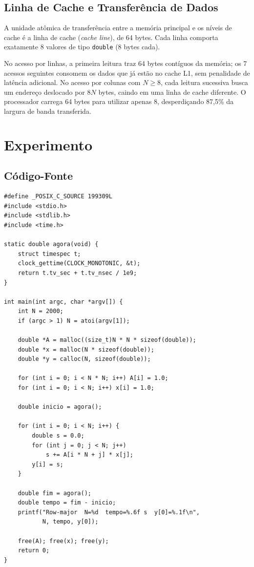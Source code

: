 \documentclass[11pt,letterpaper]{article}
\begin{document}
\subsection{Linha de Cache e Transferência de Dados}

A unidade atômica de transferência entre a memória principal e os níveis de cache é a linha de cache (\textit{cache line}), de 64 bytes. Cada linha comporta exatamente 8 valores de tipo \texttt{double} (8 bytes cada). 

No acesso por linhas, a primeira leitura traz 64 bytes contíguos da memória; os 7 acessos seguintes consomem os dados que já estão no cache L1, sem penalidade de latência adicional. No acesso por colunas com $N \ge 8$, cada leitura sucessiva busca um endereço deslocado por $8N$ bytes, caindo em uma linha de cache diferente. O processador carrega 64 bytes para utilizar apenas 8, desperdiçando 87,5\% da largura de banda transferida.

\newpage
\section{Experimento}

\subsection{Código-Fonte}

\begin{lstlisting}[caption={Acesso por linhas (row-major)}, label={lst:row}]
#define _POSIX_C_SOURCE 199309L
#include <stdio.h>
#include <stdlib.h>
#include <time.h>

static double agora(void) {
    struct timespec t;
    clock_gettime(CLOCK_MONOTONIC, &t);
    return t.tv_sec + t.tv_nsec / 1e9;
}

int main(int argc, char *argv[]) {
    int N = 2000;
    if (argc > 1) N = atoi(argv[1]);

    double *A = malloc((size_t)N * N * sizeof(double));
    double *x = malloc(N * sizeof(double));
    double *y = calloc(N, sizeof(double));

    for (int i = 0; i < N * N; i++) A[i] = 1.0;
    for (int i = 0; i < N; i++) x[i] = 1.0;

    double inicio = agora();

    for (int i = 0; i < N; i++) {
        double s = 0.0;
        for (int j = 0; j < N; j++)
            s += A[i * N + j] * x[j];
        y[i] = s;
    }

    double fim = agora();
    double tempo = fim - inicio;
    printf("Row-major  N=%d  tempo=%.6f s  y[0]=%.1f\n",
           N, tempo, y[0]);

    free(A); free(x); free(y);
    return 0;
}
\end{lstlisting}
\end{document}
